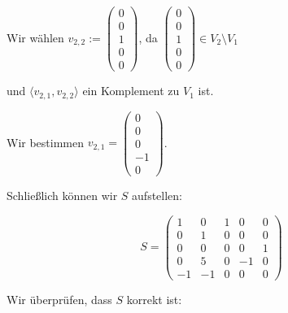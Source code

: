 \documentclass[a4paper,12pt]{article}
\begin{document}
Wir wählen $v_{2,2} := \begin{pmatrix}0\\0\\1\\0\\0\end{pmatrix}$, da $\begin{pmatrix}0\\0\\1\\0\\0\end{pmatrix} \in V_2 \setminus V_1$

und $\langle v_{2,1}, v_{2,2}\rangle$ ein Komplement zu $V_1$ ist.

Wir bestimmen $v_{2,1} = \begin{pmatrix}0\\0\\0\\-1\\0\end{pmatrix}$.

Schließlich können wir $S$ aufstellen:

\[
S =
\begin{pmatrix}
1 & 0 & 1 & 0 & 0 \\
0 & 1 & 0 & 0 & 0 \\
0 & 0 & 0 & 0 & 1 \\
0 & 5 & 0 & -1 & 0 \\
-1 & -1 & 0 & 0 & 0
\end{pmatrix}
\]

Wir überprüfen, dass $S$ korrekt ist:
\end{document}
